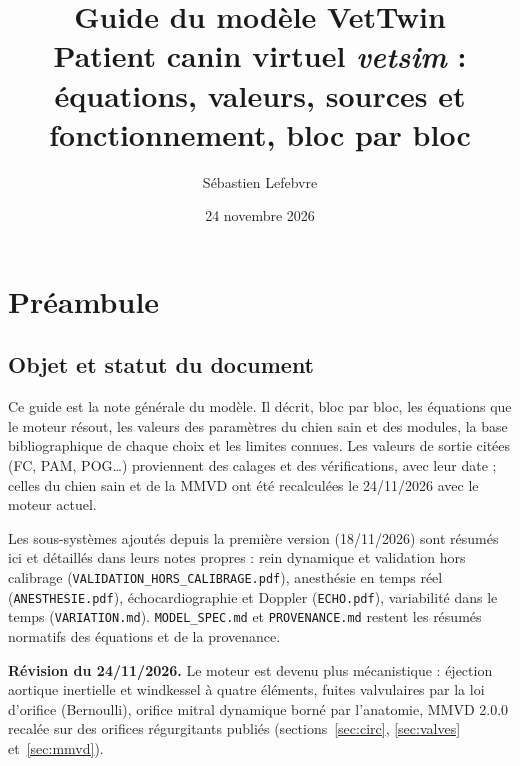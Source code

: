 \documentclass[10pt,a4paper]{article}
\title{Guide du modèle VetTwin\\[0.3em]
\large Patient canin virtuel \emph{vetsim} : équations, valeurs, sources et fonctionnement, bloc par bloc}
\author{Sébastien Lefebvre}
\date{24 novembre 2026}
\newcommand{\cmd}[1]{\texttt{#1}}
\begin{document}
\sloppy
\maketitle

\begin{center}
\end{center}

\tableofcontents
\newpage

\section{Préambule}

\subsection{Objet et statut du document}
Ce guide est la note générale du modèle. Il décrit, bloc par bloc, les équations que le moteur résout, les valeurs des paramètres du chien sain et des modules, la base bibliographique de chaque choix et les limites connues. Les valeurs de sortie citées (FC, PAM, POG\ldots) proviennent des calages et des vérifications, avec leur date ; celles du chien sain et de la MMVD ont été recalculées le 24/11/2026 avec le moteur actuel.

Les sous-systèmes ajoutés depuis la première version (18/11/2026) sont résumés ici et détaillés dans leurs notes propres : rein dynamique et validation hors calibrage (\cmd{VALIDATION\_HORS\_CALIBRAGE.pdf}), anesthésie en temps réel (\cmd{ANESTHESIE.pdf}), échocardiographie et Doppler (\cmd{ECHO.pdf}), variabilité dans le temps (\cmd{VARIATION.md}). \cmd{MODEL\_SPEC.md} et \cmd{PROVENANCE.md} restent les résumés normatifs des équations et de la provenance.

\textbf{Révision du 24/11/2026.} Le moteur est devenu plus mécanistique : éjection aortique inertielle et windkessel à quatre éléments, fuites valvulaires par la loi d'orifice (Bernoulli), orifice mitral dynamique borné par l'anatomie, MMVD 2.0.0 recalée sur des orifices régurgitants publiés (sections~\ref{sec:circ}, \ref{sec:valves} et~\ref{sec:mmvd}).
\end{document}
